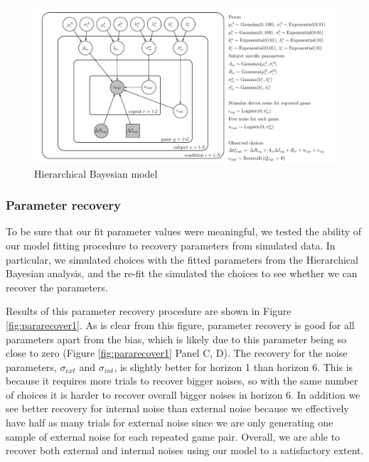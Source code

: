 \documentclass[12pt]{article}
\begin{document}
	\begin{figure}[H]
		\begin{center}
			\includegraphics[width=1\textwidth]{figures/Siyu_EEHorizon_2sigma_final.pdf}
			\caption{Hierarchical Bayesian model}
			\label{fig:model}
		\end{center}
	\end{figure}
	
	\subsubsection*{Parameter recovery\label{ch:appendix:bayesrecovery}}
	
	To be sure that our fit parameter values were meaningful, we tested the ability of our model fitting procedure to recovery parameters from simulated data.  In particular, we simulated choices with the fitted parameters from the Hierarchical Bayesian analysis, and the re-fit the simulated the choices to see whether we can recover the parameters. 
	
	Results of this parameter recovery procedure are shown in Figure \ref{fig:pararecover1}. As is clear from this figure, parameter recovery is good for all parameters apart from the bias, which is likely due to this parameter being so close to zero (Figure \ref{fig:pararecover1} Panel C, D).  The recovery for the noise parameters, $\sigma_{ext}$ and $\sigma_{int}$, is slightly better for horizon 1 than horizon 6. This is because it requires more trials to recover bigger noises, so with the same number of choices it is harder to recover overall bigger noises in horizon 6. In addition we see better recovery for internal noise than external noise because we effectively have half as many trials for external noise since we are only generating one sample of external noise for each repeated game pair. Overall, we are able to recover both external and internal noises using our model to a satisfactory extent.
	
\end{document}
